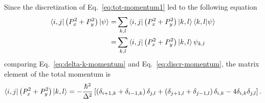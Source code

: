 Since the discretization of Eq.~\eqref{eq:tot-momentum1} led to the following equation
\begin{subequations}
\begin{align}
\bra{i,j} \left( P_x^2 + P_y^2 \right) \ket{\psi} = & \sum_{k,l} \bra{i,j} \left( P_x^2 + P_y^2 \right) \ket{k,l} \braket{k,l|\psi} \\
= & \sum_{k,l} \bra{i,j} \left( P_x^2 + P_y^2 \right) \ket{k,l} \psi_{k,l} \label{eq:discr-momentum}
\end{align}
\end{subequations}
comparing Eq.~\eqref{eq:delta-k-momentum} and Eq.~\eqref{eq:discr-momentum}, the matrix element of the total momentum is
\begin{equation} \label{eq:delta-kroneker}
\bra{i,j} \left( P_x^2 + P_y^2 \right) \ket{k,l} = -\frac{\hbar^2}{\Delta^2} \left[ \left( \delta_{i+1,k} + \delta_{i-1,k} \right) \delta_{j,l} + \left( \delta_{j+1,l} + \delta_{j-1,l} \right) \delta_{i,k} - 4 \delta_{i,k} \delta_{j,l} \right].
\end{equation}

